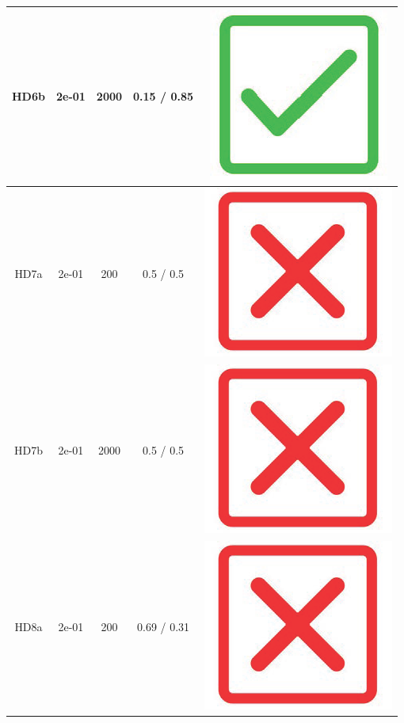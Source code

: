 \begin{table}[!h]
{\begin{tabular}[t]{ccccc}
\midrule
HD6b & 2e-01 & 2000 & 0.15 / 0.85 & \includegraphics[scale=0.05]{figures/green_tick.png}\\
\midrule
HD7a & 2e-01 & 200 & 0.5 / 0.5 & \includegraphics[scale=0.05]{figures/red_cross.png}\\
\midrule
HD7b & 2e-01 & 2000 & 0.5 / 0.5 & \includegraphics[scale=0.05]{figures/red_cross.png}\\
\midrule
HD8a & 2e-01 & 200 & 0.69 / 0.31 & \includegraphics[scale=0.05]{figures/red_cross.png}\\

\end{tabular}}
\end{table}
